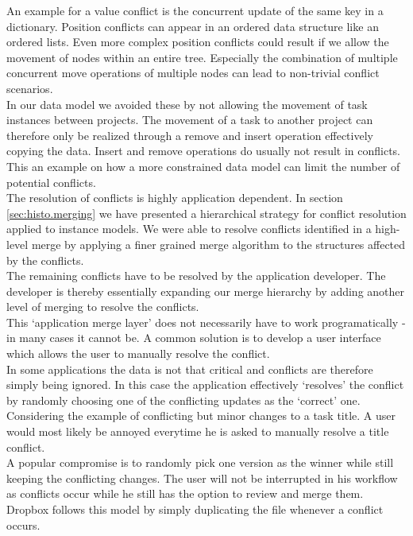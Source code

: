 An example for a value conflict is the concurrent update of the same key in a dictionary.
Position conflicts can appear in an ordered data structure like an ordered lists.
Even more complex position conflicts could result if we allow the movement of nodes within an entire tree.
Especially the combination of multiple concurrent move operations of multiple nodes can lead to non-trivial conflict scenarios.\\
In our data model we avoided these by not allowing the movement of task instances between projects.
The movement of a task to another project can therefore only be realized through a remove and insert operation effectively copying the data.
Insert and remove operations do usually not result in conflicts.
This an example on how a more constrained data model can limit the number of potential conflicts.\\
The resolution of conflicts is highly application dependent.
In section \ref{sec:histo.merging} we have presented a hierarchical strategy for conflict resolution applied to instance models.
We were able to resolve conflicts identified in a high-level merge by applying a finer grained merge algorithm to the structures affected by the conflicts.\\
The remaining conflicts have to be resolved by the application developer.
The developer is thereby essentially expanding our merge hierarchy by adding another level of merging to resolve the conflicts.\\
This `application merge layer' does not necessarily have to work programatically - in many cases it cannot be.
A common solution is to develop a user interface which allows the user to manually resolve the conflict.\\
In some applications the data is not that critical and conflicts are therefore simply being ignored.
In this case the application effectively `resolves' the conflict by randomly choosing one of the conflicting updates as the `correct' one.\\
Considering the example of conflicting but minor changes to a task title.
A user would most likely be annoyed everytime he is asked to manually resolve a title conflict.\\
A popular compromise is to randomly pick one version as the winner while still keeping the conflicting changes.
The user will not be interrupted in his workflow as conflicts occur while he still has the option to review and merge them.\\
Dropbox follows this model by simply duplicating the file whenever a conflict occurs.
